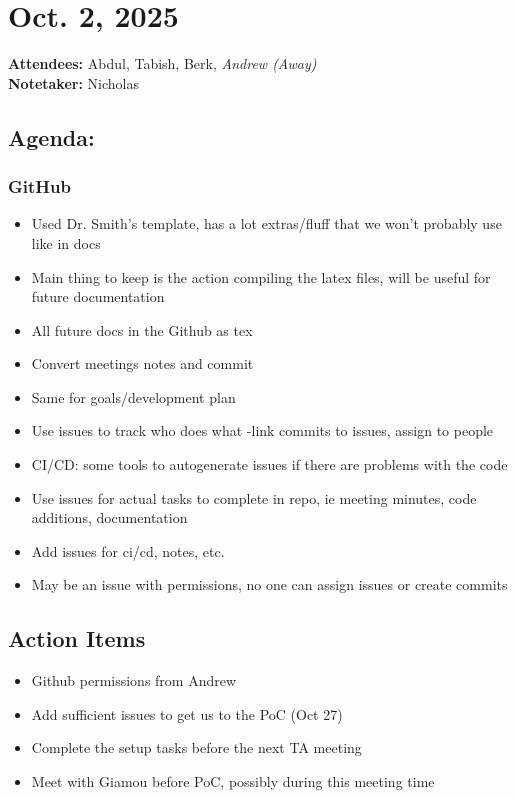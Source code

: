 	\pagebreak
	\section*{Oct. 2, 2025}

	\textbf{Attendees:} Abdul, Tabish, Berk, \textit{Andrew (Away)} \\
	\textbf{Notetaker:} Nicholas

		\subsection*{Agenda:}
			\subsubsection*{GitHub}
				\begin{itemize}
					\item Used Dr. Smith’s template, has a lot extras/fluff that we won’t probably use like in docs
					\item Main thing to keep is the action compiling the latex files, will be useful for future documentation
					\item All future docs in the Github as tex
					\item Convert meetings notes and commit
					\item Same for goals/development plan
					\item Use issues to track who does what -link commits to issues, assign to people
					\item CI/CD: some tools to autogenerate issues if there are problems with the code
					\item Use issues for actual tasks to complete in repo, ie meeting minutes, code additions, documentation
					\item Add issues for ci/cd, notes, etc.
					\item May be an issue with permissions, no one can assign issues or create commits
				\end{itemize}
		\subsection*{Action Items}
			\begin{itemize}
				\item Github permissions from Andrew
				\item Add sufficient issues to get us to the PoC (Oct 27)
				\item Complete the setup tasks before the next TA meeting
				\item Meet with Giamou before PoC, possibly during this meeting time
			\end{itemize}


